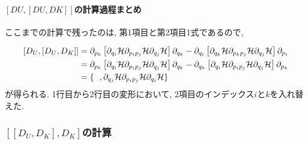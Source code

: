 \paragraph{$[DU , [DU , DK]]$の計算過程まとめ}

ここまでの計算で残ったのは, 第1項目と第2項目1式であるので,

\begin{align}
  \left[D_{U}, [D_{U}, D_{K}]\right]
  &=
  \partial_{p_{k}}
  \left[
    \partial_{q_{i}}       \mathcal{H}
    \partial_{p_{i} p_{j}} \mathcal{H}
    \partial_{q_{j}}       \mathcal{H}
  \right]
  \partial_{q_{k}}
  -
  \partial_{q_{i}}
  \left[
    \partial_{q_{k}}       \mathcal{H}
    \partial_{p_{k} p_{j}} \mathcal{H}
    \partial_{q_{j}}       \mathcal{H}
  \right]
  \partial_{p_{i}}
  \notag \\
  &=
  \partial_{p_{k}}
  \left[
    \partial_{q_{i}}       \mathcal{H}
    \partial_{p_{i} p_{j}} \mathcal{H}
    \partial_{q_{j}}       \mathcal{H}
  \right]
  \partial_{q_{k}}
  -
  \partial_{q_{k}}
  \left[
    \partial_{q_{i}}       \mathcal{H}
    \partial_{p_{i} p_{j}} \mathcal{H}
    \partial_{q_{j}}       \mathcal{H}
  \right]
  \partial_{p_{k}}
  \notag \\
  &=
  \{~~,
  \partial_{q_{j}}       \mathcal{H}
  \partial_{p_{i} p_{j}} \mathcal{H}
  \partial_{q_{i}}       \mathcal{H}
  \}
  \notag
\end{align}
が得られる.
1行目から2行目の変形において, 2項目のインデックス$i$と$k$を入れ替えた.

\subsubsection{$[[D_{U}, D_{K}], D_{K}]$の計算}






% 
% 

